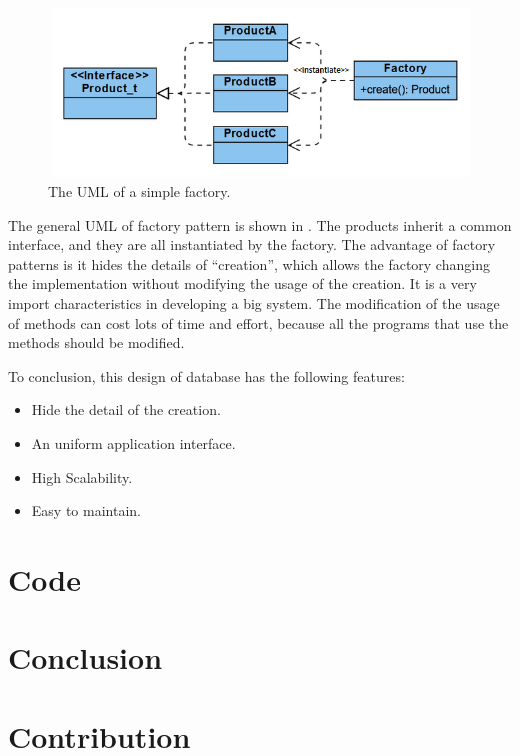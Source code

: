 \documentclass{article}
\begin{document}
  \begin{figure}[h]
    \centering
    \includegraphics[scale = 0.7]{asset/database/simple_factory.png}
    \caption{The UML of a simple factory.}
    \label{fig:simple_factory}
  \end{figure}
  The general UML of factory pattern is shown in . The 
  products inherit a common interface, and they are all instantiated by the factory. 
  The advantage of factory patterns is it hides the details of ``creation'', which 
  allows the factory changing the implementation without modifying the usage of the 
  creation. It is a very import characteristics in developing a big system. The 
  modification of the usage of methods can cost lots of time and effort, because 
  all the programs that use the methods should be modified. 
  
  To conclusion, this design of database has the following features:
  \begin{itemize}
    \item Hide the detail of the creation. 
    \item An uniform application interface. 
    \item High Scalability. 
    \item Easy to maintain. 
  \end{itemize}

\section{Code}
\label{sec:code}

\section{Conclusion}
\label{sec:conclusion}

\section{Contribution}
\label{sec:contribution}
\end{document}
